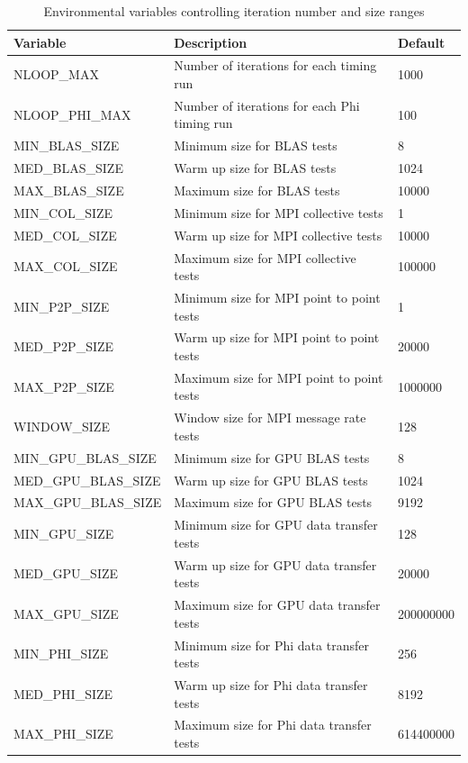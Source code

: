 \documentclass[10pt,a4paper]{report}
\begin{document}
\begin{table}[ht]
\centering
\caption{Environmental variables controlling iteration number and size ranges}
\label{tab:env}
\begin{tabular}{|l|l|l|}
\hline
\bf{Variable}	& \bf{Description}                          & \bf{Default}\\\hline
NLOOP\_MAX      & Number of iterations for each timing run  & 1000\\
NLOOP\_PHI\_MAX & Number of iterations for each Phi timing run  & 100\\
MIN\_BLAS\_SIZE & Minimum size for BLAS tests               & 8\\
MED\_BLAS\_SIZE & Warm up size for BLAS tests               & 1024\\
MAX\_BLAS\_SIZE & Maximum size for BLAS tests               & 10000\\
MIN\_COL\_SIZE  & Minimum size for MPI collective tests     & 1\\
MED\_COL\_SIZE  & Warm up size for MPI collective tests     & 10000\\
MAX\_COL\_SIZE  & Maximum size for MPI collective tests     & 100000\\
MIN\_P2P\_SIZE  & Minimum size for MPI point to point tests & 1\\
MED\_P2P\_SIZE  & Warm up size for MPI point to point tests & 20000\\
MAX\_P2P\_SIZE  & Maximum size for MPI point to point tests & 1000000\\
WINDOW\_SIZE    & Window size for MPI message rate tests    & 128\\
MIN\_GPU\_BLAS\_SIZE & Minimum size for GPU BLAS tests      & 8\\
MED\_GPU\_BLAS\_SIZE & Warm up size for GPU BLAS tests      & 1024\\
MAX\_GPU\_BLAS\_SIZE & Maximum size for GPU BLAS tests      & 9192\\
MIN\_GPU\_SIZE  & Minimum size for GPU data transfer tests  & 128\\
MED\_GPU\_SIZE  & Warm up size for GPU data transfer tests  & 20000\\
MAX\_GPU\_SIZE  & Maximum size for GPU data transfer tests  & 200000000\\
MIN\_PHI\_SIZE  & Minimum size for Phi data transfer tests  & 256\\
MED\_PHI\_SIZE  & Warm up size for Phi data transfer tests  & 8192\\
MAX\_PHI\_SIZE  & Maximum size for Phi data transfer tests  & 614400000\\\hline
\end{tabular}
\end{table}
\end{document}
